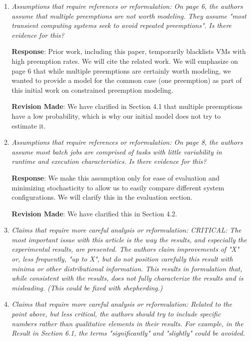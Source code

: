 \documentclass{article}
\newcommand{\resp}[1]{\textbf{Response}: #1}
\newcommand{\revmade}[1]{\textbf{Revision Made}: #1}
\begin{document}
\begin{enumerate}


\item \emph{Assumptions that require references or reformulation: On page 6, the authors assume that multiple preemptions are not worth modeling. They assume "most transient computing systems seek to avoid repeated preemptions". Is there evidence for this?}

  \resp{Prior work, including this paper, temporarily blacklists VMs with high preemption rates. We will cite the related work. We will emphasize on page 6 that while multiple preemptions are certainly worth modeling, we wanted to provide a model for the common case (one preemption) as part of this initial work on constrained preemption modeling.}

\revmade{We have clarified in Section 4.1 that multiple preemptions have a low probability, which is why our initial model does not try to estimate it.}

\item \emph{Assumptions that require references or reformulation: On page 8, the authors assume most batch jobs are comprised of tasks with little variability in runtime and execution characteristics. Is there evidence for this?}

\resp{We make this assumption only for ease of evaluation and minimizing stochasticity to allow us to easily compare different system configurations. We will clarify this in the evaluation section.}

\revmade{We have clarified this in Section 4.2.}

\item \emph{Claims that require more careful analysis or reformulation: CRITICAL: The most important issue with this article is the way the results, and especially the experimental results, are presented. The authors claim improvements of "X" or, less frequently, "up to X", but do not position carefully this result with minima or other distributional information. This results in formulation that, while consistent with the results, does not fully characterize the results and is misleading. (This could be fixed with shepherding.)}

\item \emph{Claims that require more careful analysis or reformulation: Related to the point above, but less critical, the authors should try to include specific numbers rather than qualitative elements in their results. For example, in the Result in Section 6.1, the terms "significantly" and "slightly" could be avoided.}


\end{enumerate}
\end{document}
